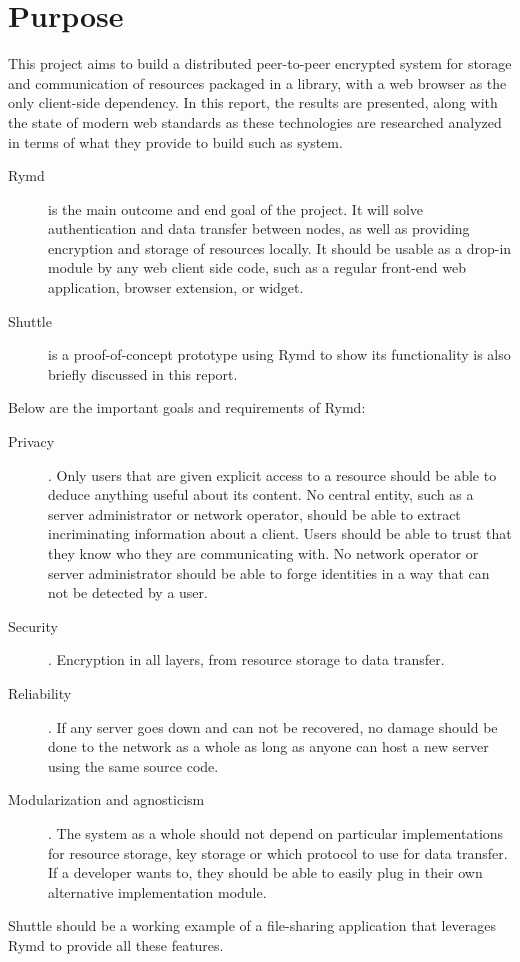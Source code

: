 \section{Purpose}

This project aims to build a distributed peer-to-peer encrypted system for storage and communication of resources packaged in a library, with a web browser as the only client-side dependency. In this report, the results are presented, along with the state of modern web standards as these technologies are researched analyzed in terms of what they provide to build such as system.

\begin{description}
\item[Rymd] is the main outcome and end goal of the project. It will solve authentication and data transfer between nodes, as well as providing encryption and storage of resources locally. It should be usable as a drop-in module by any web client side code, such as a regular front-end web application, browser extension, or widget.
\item[Shuttle] is a proof-of-concept prototype using Rymd to show its functionality is also briefly discussed in this report.
\end{description}

Below are the important goals and requirements of Rymd:

\begin{description}
  \item[Privacy]. Only users that are given explicit access to a resource should be able to deduce anything useful about its content. No central entity, such as a server administrator or network operator, should be able to extract incriminating information about a client. Users should be able to trust that they know who they are communicating with. No network operator or server administrator should be able to forge identities in a way that can not be detected by a user.

\item[Security]. Encryption in all layers, from resource storage to data transfer.

\item[Reliability]. If any server goes down and can not be recovered, no damage should be done to the network as a whole as long as anyone can host a new server using the same source code.

\item[Modularization and agnosticism]. The system as a whole should not depend on particular implementations for resource storage, key storage or which protocol to use for data transfer. If a developer wants to, they should be able to easily plug in their own alternative implementation module.

\end{description}

Shuttle should be a working example of a file-sharing application that leverages Rymd to provide all these features.

